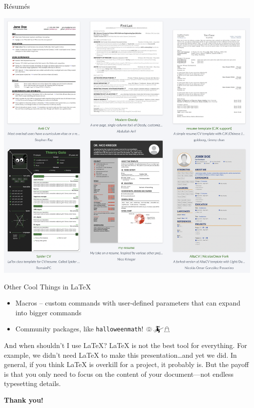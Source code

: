 \documentclass{beamer}
\begin{document}
\begin{frame}{Résumés}
\begin{center}
\includegraphics[scale=0.25]{resumes.png}
\end{center}
\end{frame}

\begin{frame}{Other Cool Things in \LaTeX}
    \begin{itemize}
        \item Macros -- custom commands with user-defined parameters that can expand into bigger commands
        \item Community packages, like \texttt{halloweenmath}! $\pumpkin \mathwitch \mathghost$
    \end{itemize}
\end{frame}

\begin{frame}{And when shouldn't I use \LaTeX?}
    \LaTeX{} is not the best tool for everything. For example, we didn't need \LaTeX{} to make this presentation\ldots and yet we did.
    \newline\newline
    In general, if you think \LaTeX{} is overkill for a project, it probably is.
    \newline\newline
    But the payoff is that you only need to focus on the content of your document---not endless typesetting details.
\end{frame}

\begin{frame}{}
\begin{center}
\par\bigskip
  {\Large\bfseries Thank you!}\par\smallskip
  \end{center}
\end{frame}
\end{document}
